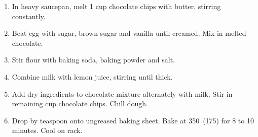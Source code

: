 
\begin{ingredients}
\end{ingredients}


\begin{recipe}
  \begin{enumerate}
  \item In heavy saucepan, melt 1 cup chocolate chips with butter, stirring
    constantly.

  \item Beat egg with sugar, brown sugar and vanilla until
    creamed.  Mix in melted chocolate.

  \item Stir flour with baking soda,
    baking powder and salt.

  \item Combine milk with lemon juice, stirring
    until thick.

  \item Add dry ingredients to chocolate mixture alternately
    with milk.  Stir in remaining cup chocolate chips.  Chill
    dough.

  \item Drop by teaspoon onto ungreased baking sheet.  Bake at 350\F\ (175\degreeC)
    for 8 to 10 minutes.  Cool on rack.
    
  \end{enumerate}
\end{recipe}
